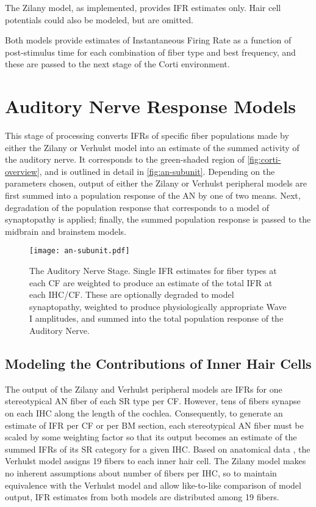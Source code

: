 The Zilany model, as implemented, provides IFR estimates only.  Hair cell potentials could also be modeled, but are omitted.

Both models provide estimates of Instantaneous Firing Rate as a function of post-stimulus time for each combination of fiber type and best frequency, and these are passed to the next stage of the Corti environment.


\section{Auditory Nerve Response Models} %
\label{sec:auditory_nerve_response_models}
This stage of processing converts IFRs of specific fiber populations made by either the Zilany or Verhulst model into an estimate of the summed activity of the auditory nerve. It corresponds to the green-shaded region of \autoref{fig:corti-overview}, and is outlined in detail in \autoref{fig:an-subunit}.  Depending on the parameters chosen, output of either the Zilany or Verhulst peripheral models are first summed into a population response of the AN by one of two means.  Next, degradation of the population response that corresponds to a model of synaptopathy is applied; finally, the summed population response is passed to the midbrain and brainstem models.

\begin{figure}[htbp]
	\centering
	\texttt{[image: an-subunit.pdf]}
	\caption[The Auditory Nerve Stage]{The Auditory Nerve Stage. Single IFR estimates for fiber types at each CF are weighted to produce an estimate of the total IFR at each IHC/CF.  These are optionally degraded to model synaptopathy, weighted to produce physiologically appropriate Wave I amplitudes, and summed into the total population response of the Auditory Nerve.}
	\label{fig:an-subunit}
\end{figure}

\subsection{Modeling the Contributions of Inner Hair Cells} %
\label{sub:contributions_to_the_response_by_inner_hair_cells}
The output of the Zilany and Verhulst peripheral models are IFRs for one stereotypical AN fiber of each SR type per CF.   However, tens of fibers synapse on each IHC along the length of the cochlea.  Consequently, to generate an estimate of IFR per CF or per BM section, each stereotypical AN fiber must be scaled by some weighting factor so that its output becomes an estimate of the summed IFRs of its SR category for a given IHC.  Based on anatomical data \citep{Liberman1978AuditoryNerve}, the Verhulst model assigns 19 fibers to each inner hair cell.  The Zilany model makes no inherent assumptions about number of fibers per IHC, so to maintain equivalence with the Verhulst model and allow like-to-like comparison of model output, IFR estimates from both models are distributed among 19 fibers.

